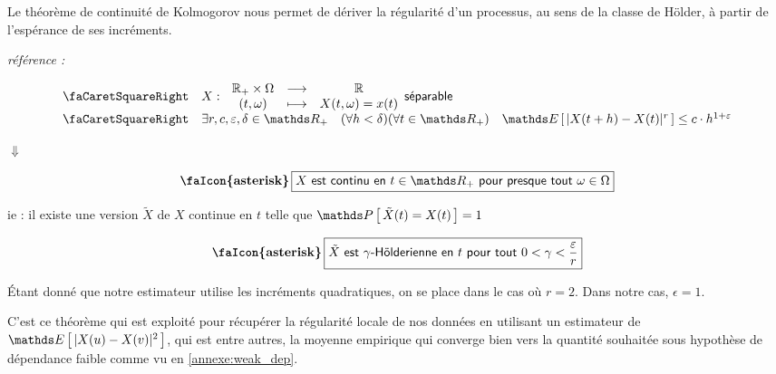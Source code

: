 Le théorème de continuité de Kolmogorov nous permet de dériver la régularité d'un processus, au sens de la classe de Hölder, à partir de l'espérance de ses incréments.

\begin{thm}
	\emph{référence : } ~\cite[thm : 2.197 | page : 145]{capasso2015introduction}

	\begin{equation*}
		\begin{array}{ll}
			\textsf{\faCaretSquareRight}
			 & X : \, \begin{array}{ccc}
				          \mathbb{R_+} \times \Omega & \longrightarrow & \mathbb{R}          \\
				          (t, \omega)                & \longmapsto     & X(t, \omega) = x(t)
			          \end{array} \textsf{séparable}
			\\
			\textsf{\faCaretSquareRight}
			 & \exists r,c, \varepsilon, \delta \in \mathds R_+ \quad (\forall h < \delta)(\forall t \in \mathds R_+)  \quad \esperance{ | X(t+h) - X(t) |^r } \leq c\cdot h^{1+\varepsilon}
		\end{array}
	\end{equation*}

	\begin{center}
		$\Downarrow$
	\end{center}
	\begin{equation*}
		\textbf{\faIcon{asterisk}}\, \boxed{
			X \textsf{ est continu en } t \in \mathds R_+ \textsf{ pour presque tout } \omega \in \Omega
		}
	\end{equation*}
	\begin{center}
		ie : il existe une version $\tilde X$ de $X$ continue en $t$ telle que $\proba{ \tilde X(t) = X(t)} = 1$
	\end{center}

	\begin{equation*}
		\textbf{\faIcon{asterisk}} \, \boxed{
			\tilde{X} \textsf{ est } \gamma \textsf{-Hölderienne en } t  \textsf{ pour tout } 0 < \gamma < \frac{\varepsilon}{r}
		}
	\end{equation*}
	\label{thm:kolmogorov_continuite}
\end{thm}

Étant donné que notre estimateur utilise les incréments quadratiques, on se place dans le cas où $r = 2$. Dans notre cas, $\epsilon = 1$.

\largeskip

C'est ce théorème qui est exploité pour récupérer la régularité locale de nos données en utilisant un estimateur de $\esperance{ |X(u) - X(v)|^2}$, qui est entre autres, la moyenne empirique qui converge bien vers la quantité souhaitée sous hypothèse de dépendance faible comme vu en \ref{annexe:weak_dep}.